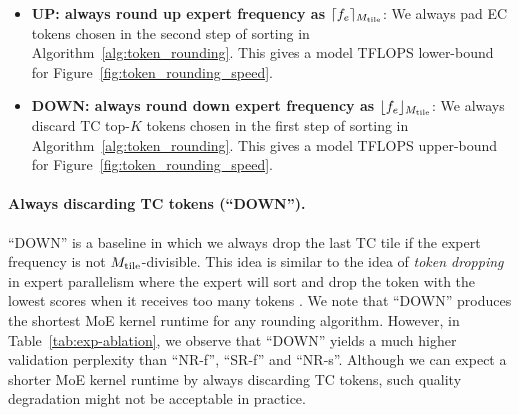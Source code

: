 \begin{itemize}
    \vspace{-2em}
    \begin{equation}
        \max_{e\in [E]} \left|\lceil f_e\rfloor_{\tileM} - f_e \right| \leq \tileM/2, \qquad \left|\sum_{e=1}^E\lceil f_e\rfloor_{\tileM} - \sum_{e=1}^E f_e \right| \leq \tileM/2 
    \end{equation}
    \vspace{-1em}

    where the other rounding subroutine will have an expected deviation of $O \left( \tileM\sqrt{E} \right)$ for $\sum_{e=1}^E\lceil f_e\rfloor_{\tileM}$.

    \item \textbf{UP: always round up expert frequency as $\lceil f_e\rceil_{M_\mathrm{tile}}$}: We always pad EC tokens chosen in the second step of sorting in Algorithm~\ref{alg:token_rounding}. This gives a model TFLOPS lower-bound for Figure~\ref{fig:token_rounding_speed}. 

    \item \textbf{DOWN: always round down expert frequency as $\lfloor f_e\rfloor_{M_\mathrm{tile}}$}: We always discard TC top-$K$ tokens chosen in the first step of sorting in Algorithm~\ref{alg:token_rounding}. This gives a model TFLOPS upper-bound for Figure~\ref{fig:token_rounding_speed}.
\end{itemize}



\paragraph{Always discarding TC tokens (``DOWN'').} ``DOWN'' is a baseline in which we always drop the last TC tile if the expert frequency is not $M_\mathrm{tile}$-divisible. This idea is similar to the idea of \textit{token dropping} in expert parallelism where the expert will sort and drop the token with the lowest scores when it receives too many tokens \citep{fedus2022switchtransformersscalingtrillion}. We note that ``DOWN'' produces the shortest MoE kernel runtime for any rounding algorithm. However, in Table~\ref{tab:exp-ablation}, we observe that ``DOWN'' yields a much higher validation perplexity than ``NR-f'', ``SR-f'' and ``NR-s''. Although we can expect a shorter MoE kernel runtime by always discarding TC tokens, such quality degradation might not be acceptable in practice.

